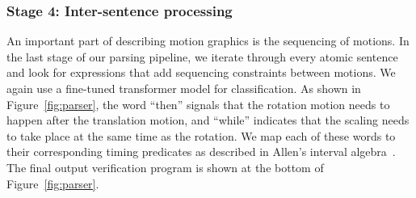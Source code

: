 \subsubsection{Stage 4: Inter-sentence processing}
An important part of describing motion graphics is the sequencing of
motions.  In the last stage of our parsing pipeline, we iterate
through every atomic sentence and look for expressions that add
sequencing constraints between motions.  We again use a fine-tuned
transformer model for classification.
As shown in
Figure~\ref{fig:parser}, the word ``then'' signals that the rotation
motion needs to happen after the translation motion, and ``while''
indicates that the scaling needs to take place at the same time as the
rotation.  We map each of these words to their corresponding timing
predicates as described in Allen's interval
algebra~\cite{allen1983interval}.
The final output verification
program is shown at the bottom of Figure~\ref{fig:parser}.

